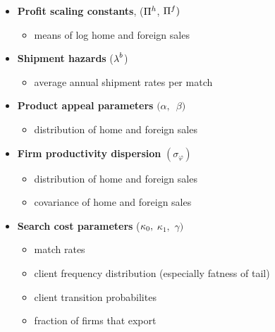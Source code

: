 \documentclass[notes=show]{beamer}
\begin{document}
\begin{frame}%



\begin{itemize}
\item \textbf{Profit scaling constants}, (${\small \Pi }^{h}$, ${\small \Pi }%
^{f})$

\begin{itemize}
\item means of log home and foreign sales
\end{itemize}

\item \textbf{Shipment hazards} (${\small \lambda }^{b}$)

\begin{itemize}
\item average annual shipment rates per match
\end{itemize}

\item \textbf{Product appeal parameters} $(\alpha ,$\ $\beta )$

\begin{itemize}
\item distribution of home and foreign sales
\end{itemize}

\item \textbf{Firm productivity dispersion} $(\sigma _{\varphi })$

\begin{itemize}
\item distribution of home and foreign sales

\item covariance of home and foreign sales
\end{itemize}

\item \textbf{Search cost parameters} (${\small \kappa }_{0}{\small ,}$ $%
\kappa _{1},$ $\gamma )$

\begin{itemize}
\item match rates

\item client frequency distribution (especially fatness of tail)

\item client transition probabilites

\item fraction of firms that export
\end{itemize}
\end{itemize}

\end{frame}%
\end{document}
